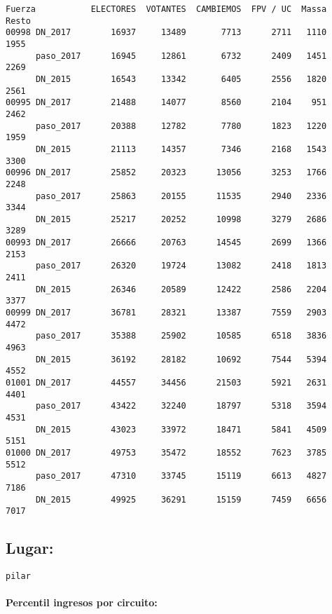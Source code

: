 \documentclass[11pt]{article}
\begin{document}
    
    
    \begin{verbatim}
Fuerza           ELECTORES  VOTANTES  CAMBIEMOS  FPV / UC  Massa  Resto
00998 DN_2017        16937     13489       7713      2711   1110   1955
      paso_2017      16945     12861       6732      2409   1451   2269
      DN_2015        16543     13342       6405      2556   1820   2561
00995 DN_2017        21488     14077       8560      2104    951   2462
      paso_2017      20388     12782       7780      1823   1220   1959
      DN_2015        21113     14357       7346      2168   1543   3300
00996 DN_2017        25852     20323      13056      3253   1766   2248
      paso_2017      25863     20155      11535      2940   2336   3344
      DN_2015        25217     20252      10998      3279   2686   3289
00993 DN_2017        26666     20763      14545      2699   1366   2153
      paso_2017      26320     19724      13082      2418   1813   2411
      DN_2015        26346     20589      12422      2586   2204   3377
00999 DN_2017        36781     28321      13387      7559   2903   4472
      paso_2017      35388     25902      10585      6518   3836   4963
      DN_2015        36192     28182      10692      7544   5394   4552
01001 DN_2017        44557     34456      21503      5921   2631   4401
      paso_2017      43422     32240      18797      5318   3594   4531
      DN_2015        43023     33972      18471      5841   4509   5151
01000 DN_2017        49753     35472      18552      7623   3785   5512
      paso_2017      47310     33745      15119      6613   4827   7186
      DN_2015        49925     36291      15159      7459   6656   7017
    \end{verbatim}

    
    \hypertarget{lugar}{%
\subsection{Lugar:}\label{lugar}}

    
    \begin{Verbatim}[commandchars=\\\{\}]
pilar

    \end{Verbatim}

    \hypertarget{percentil-ingresos-por-circuito}{%
\paragraph{Percentil ingresos por
circuito:}\label{percentil-ingresos-por-circuito}}
\end{document}
